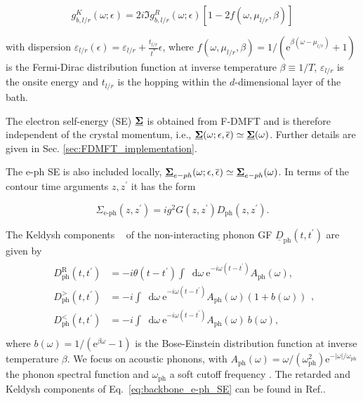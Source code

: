 \documentclass[aps,prb,groupedaddress,showpacs,twocolumn,superscriptaddress,10pt]{revtex4-2}
\newcommand{\ee}{\mathrm{e}}  %
\newcommand*\dd{\mathop{}\!\mathrm{d}}
\newcommand{\kel}[1]{\underline{#1}} %
\begin{document}
\begin{equation}
\label{eq:keldysh_bath_GF}
g^{K}_{b,l/r}(\omega;\epsilon) = 2i \Im g_{b,l/r}^{R}(\omega;\epsilon)[1-2f(\omega,\mu_{l/r},\beta)]
\end{equation} 

with dispersion $\varepsilon_{l/r}(\epsilon)=\varepsilon_{l/r} +\frac{t_{l/r}}{t^*}\epsilon$, where $f(\omega,\mu_{l/r},\beta)=1/(\ee^{\beta(\omega-\mu_{l/r})}+1)$ is the Fermi-Dirac distribution function at inverse temperature $\beta \equiv 1/T$, $\varepsilon_{l/r}$ is the onsite energy and $t_{l/r}$ is the hopping within the $d$-dimensional layer of the bath. 
 


The electron self-energy (SE) $\underline{\bf{\Sigma}}$ is obtained from F-DMFT and is therefore independent of the crystal momentum, i.e., $\underline{\bf{\Sigma}}(\omega;\epsilon,\overline{\epsilon}) \simeq \underline{\bf{\Sigma}}(\omega)$. Further details are given in Sec. \ref{sec:FDMFT_implementation}. 

The e-ph SE is also included locally, $\underline{\bf{\Sigma}}_{e-ph}(\omega;\epsilon,\overline{\epsilon}) \simeq \underline{\bf{\Sigma}}_{e-ph}(\omega)$. In terms of the contour time arguments $z,z^\prime$ it has the form

\begin{equation}\label{eq:backbone_e-ph_SE}
\Sigma_{\text{e-ph}}(z,z^{\prime}) = ig^{2} G(z,z^{\prime}) D_{\text{ph}}(z,z^{\prime}).
\end{equation}

The Keldysh components ~\cite{ao.ts.14} of the non-interacting phonon GF $\kel{D}_{\text{ph}}(t,t^{\prime})$ are given by
\begin{align}\label{eq:Ph_Prop_time}
\begin{split} 
D^{\text{R}}_{\text{ph}}(t,t^{\prime}) & = -i \theta(t-t^{\prime}) \int \dd\omega \ \ee^{-i\omega\left(t-t^{\prime}\right)} A_{\text{ph}}(\omega), \\
D^{>}_{\text{ph}}(t,t^{\prime}) & = -i \int \dd\omega \ \ee^{-i\omega\left(t-t^{\prime}\right)} A_{\text{ph}}(\omega) \left( 1 + b(\omega) \right) \\
D^{<}_{\text{ph}}(t,t^{\prime}) & = -i \int \dd\omega \ \ee^{-i\omega\left(t-t^{\prime}\right)} A_{\text{ph}}(\omega) \ b(\omega), \\
\end{split},
\end{align}
where $b(\omega)=1/(\ee^{\beta\omega}-1)$ is the Bose-Einstein distribution function at inverse temperature $\beta$. We focus on acoustic phonons, with $A_{\text{ph}}(\omega) = \omega/(\omega^{2}_{\text{ph}}) \ee^{-| \omega|/\omega_{\text{ph}}}$ the phonon spectral function and $\omega_{\text{ph}}$ a soft cutoff frequency \cite{pi.li.21}. The retarded and Keldysh components of Eq.~\eqref{eq:backbone_e-ph_SE} can be found in Ref.\cite{ma.ga.22u}.
 
\end{document}
